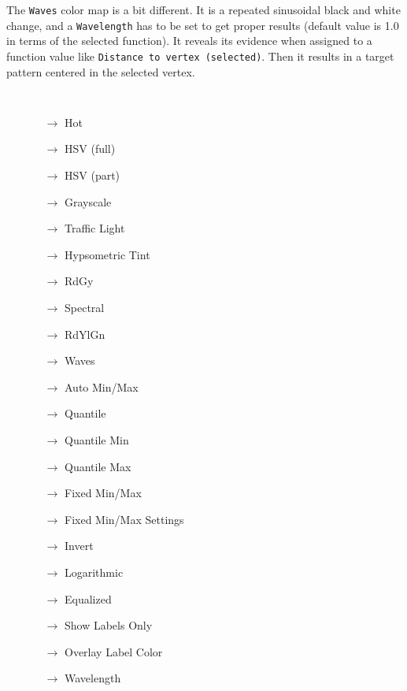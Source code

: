 The {\tt Waves} color map is a bit different. It is a repeated sinusoidal black and white change, and a {\tt Wavelength} has to be set to get proper results (default value is 1.0 in terms of the selected function). It reveals its evidence when assigned to a function value like {\tt Distance to vertex (selected)}. Then it results in a target pattern centered in the selected vertex.

{\tt 
\begin{itemize}
\item[] 
  \begin{itemize}  
  \item[$\rightarrow$] Hot
  \item[$\rightarrow$] HSV (full)
  \item[$\rightarrow$] HSV (part)
  \item[$\rightarrow$] Grayscale
  \item[$\rightarrow$] Traffic Light
  \item[$\rightarrow$] Hypsometric Tint
  \item[$\rightarrow$] RdGy
  \item[$\rightarrow$] Spectral
  \item[$\rightarrow$] RdYlGn
  \item[$\rightarrow$] Waves
  \item[$\rightarrow$] Auto Min/Max
  \item[$\rightarrow$] Quantile
  \item[$\rightarrow$] Quantile Min
  \item[$\rightarrow$] Quantile Max
  \item[$\rightarrow$] Fixed Min/Max
  \item[$\rightarrow$] Fixed Min/Max Settings
  \item[$\rightarrow$] Invert
  \item[$\rightarrow$] Logarithmic
  \item[$\rightarrow$] Equalized
  \item[$\rightarrow$] Show Labels Only
  \item[$\rightarrow$] Overlay Label Color
  \item[$\rightarrow$] Wavelength
  \end{itemize}
 \end{itemize}
 }


